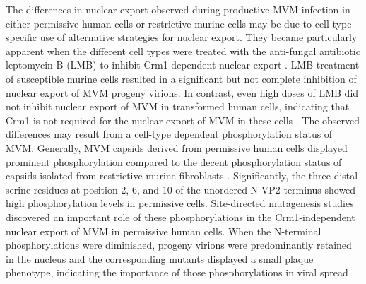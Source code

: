 The differences in nuclear export observed during productive MVM infection in either permissive human cells or restrictive murine cells may be due to cell-type-specific use of alternative strategies for nuclear export. They became particularly apparent when the different cell types were treated with the anti-fungal antibiotic leptomycin B (LMB) to inhibit Crm1-dependent nuclear export \cite{pmid9683540}. LMB treatment of susceptible murine cells resulted in a significant but not complete inhibition of nuclear export of MVM progeny virions. In contrast, even high doses of LMB did not inhibit nuclear export of MVM in transformed human cells, indicating that Crm1 is not required for the nuclear export of MVM in these cells \cite{pmid15367635}. The observed differences may result from a cell-type dependent phosphorylation status of MVM. Generally, MVM capsids derived from permissive human cells displayed prominent phosphorylation compared to the decent phosphorylation status of capsids isolated from restrictive murine fibroblasts \cite{pmid11069983}. Significantly, the three distal serine residues at position 2, 6, and 10 of the unordered N-VP2 terminus showed high phosphorylation levels in permissive cells. Site-directed mutagenesis studies discovered an important role of these phosphorylations in the Crm1-independent nuclear export of MVM in permissive human cells. When the N-terminal phosphorylations were diminished, progeny virions were predominantly retained in the nucleus and the corresponding mutants displayed a small plaque phenotype, indicating the importance of those phosphorylations in viral spread \cite{pmid15367635}. 


